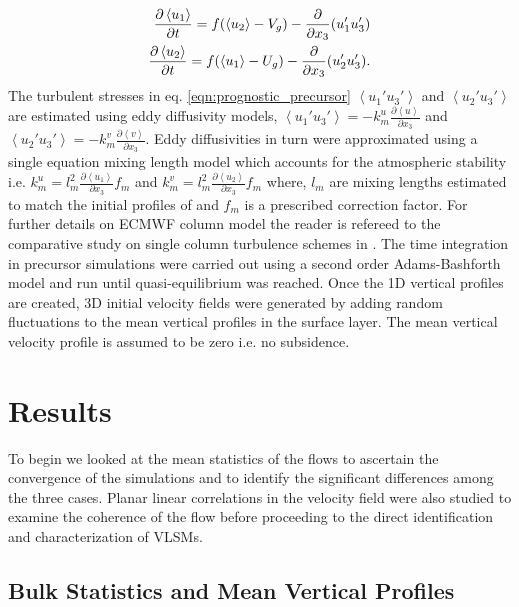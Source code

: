 \documentclass{amsart}
\begin{document}
\begin{align}
\frac{\partial \left < u_{1} \right >}{\partial t}=f(\left < u_{2} \right > - V_g)-\frac{\partial }{\partial x_3}(u_{1}'u_{3}') \notag \\
\frac{\partial \left < u_{2} \right > }{\partial t}=f(\left < u_{1} \right > - U_g)-\frac{\partial }{\partial x_3}(u_{2}'u_{3}').
\label{eqn:prognostic_precursor}
\end{align} 
The turbulent stresses in eq. \ref{eqn:prognostic_precursor} $\left < u_{1}'u_{3}' \right >$ and $\left < u_{2}'u_{3}' \right >$ are estimated using eddy diffusivity models, $\left < u_{1}'u_{3}' \right > = -k_{m}^{u}\frac{\partial \left < u \right >}{\partial x_3}$ and $\left < u_{2}'u_{3}' \right > =-k_m^{v}\frac{\partial \left < v \right >}{\partial x_3}$. Eddy diffusivities in turn were approximated using a single equation mixing length model which accounts for the atmospheric stability i.e. $k_m^{u} = l_m^2\frac{\partial \left < u_{1} \right >}{\partial x_3}f_m$ and $k_m^{v} = l_m^2\frac{\partial \left < u_{2}\right >}{\partial x_3}f_m$ where, $l_m$ are mixing lengths estimated to match the initial profiles of \citet{andren_brown_qjrm_94} and $f_m$ is a prescribed correction factor. For further details on ECMWF column model the reader is refereed to the comparative study on single column turbulence schemes in \citet{cuxart_blm_2006}. The time integration in precursor simulations were carried out using a second order Adams-Bashforth model and run until quasi-equilibrium was reached. Once the 1D vertical profiles are created, 3D initial velocity fields were generated by adding random fluctuations to the mean vertical profiles in the surface layer. The mean vertical velocity profile is assumed to be zero i.e. no subsidence. 

\section{Results}
To begin we looked at the mean statistics of the flows to ascertain the convergence of the simulations and to identify the significant differences among the three cases. Planar linear correlations in the velocity field were also studied to examine the coherence of the flow before proceeding to the direct identification and characterization of VLSMs. 
\subsection{Bulk Statistics and Mean Vertical Profiles}
\end{document}
